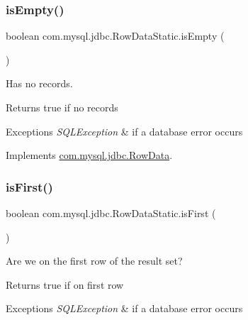 \subsubsection{\texorpdfstring{is\+Empty()}{isEmpty()}}
{\footnotesize\ttfamily boolean com.\+mysql.\+jdbc.\+Row\+Data\+Static.\+is\+Empty (\begin{DoxyParamCaption}{ }\end{DoxyParamCaption})}

Has no records.

\begin{DoxyReturn}{Returns}
true if no records 
\end{DoxyReturn}

\begin{DoxyExceptions}{Exceptions}
{\em S\+Q\+L\+Exception} & if a database error occurs \\
\hline
\end{DoxyExceptions}


Implements \mbox{\hyperlink{interfacecom_1_1mysql_1_1jdbc_1_1_row_data_afe25c16468d9db9d9458db7b1c6004f1}{com.\+mysql.\+jdbc.\+Row\+Data}}.

\mbox{\label{classcom_1_1mysql_1_1jdbc_1_1_row_data_static_a8e4c2612d743e8d39f6434627cc156cd}} 
\subsubsection{\texorpdfstring{is\+First()}{isFirst()}}
{\footnotesize\ttfamily boolean com.\+mysql.\+jdbc.\+Row\+Data\+Static.\+is\+First (\begin{DoxyParamCaption}{ }\end{DoxyParamCaption})}

Are we on the first row of the result set?

\begin{DoxyReturn}{Returns}
true if on first row 
\end{DoxyReturn}

\begin{DoxyExceptions}{Exceptions}
{\em S\+Q\+L\+Exception} & if a database error occurs \\
\hline
\end{DoxyExceptions}


